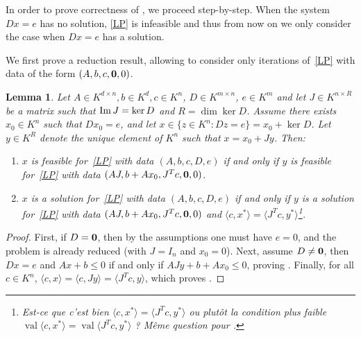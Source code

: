 \documentclass[a4paper,oneside,11pt]{article}
\newtheorem{lemma}[theorem]{Lemma}
\newcommand{\allmat}{\mathbb{M}} %
\newcommand{\simone}[1]{{\color{blue} #1}} %
\DeclareMathOperator{\val}{val}
\newcommand{\OK}{\mathcal{O}_K}
\begin{document}
In order to prove correctness of , we proceed step-by-step.
When the system $Dx=e$ has no solution, \eqref{LP} is infeasible and
thus from now on we only consider the case when $Dx=e$ has a solution.

We first prove a reduction result, allowing to consider only iterations
of~\eqref{LP} with data of the form $(A,b,c,{\bf 0},0)$.

\begin{lemma}\label{reducD}
  Let $A \in K^{d \times n}, b \in K^d, c\in K^n$, $D \in K^{m\times n}$,
  $e \in K^m$ and let $J \in K^{n \times R}$ be a matrix such that
  ${\rm Im}\, J = \ker D$ and $R = \dim \ker D$.
  Assume there exists $x_0 \in K^n$ such that $D x_0 = e$, and let
  $x \in \{z \in K^n : Dz = e\} = x_0 + \ker D$.
  Let $y \in K^R$ denote the unique element of $K^n$ such that
  $x = x_0 + J y$. Then:
  \begin{enumerate}
  \item\label{reducD_item1}
    $x$ is feasible for~\eqref{LP} with data $(A,b,c,D,e)$ if and only if 
    $y$ is feasible for~\eqref{LP} with data $(AJ,b+A x_0,J^T c,{\bf 0},0)$.
  \item\label{reducD_item2}
    $x$ is a solution for~\eqref{LP} with data $(A,b,c,D,e)$ if and only if 
    $y$ is a solution for~\eqref{LP} with data $(AJ,b+A x_0,J^T c,{\bf 0},0)$ and
    $\langle c,x^* \rangle = \langle J^T c,y^* \rangle$\footnote{\simone{Est-ce que
    c'est bien $\langle c,x^* \rangle = \langle J^T c,y^* \rangle$ ou plutôt la condition
    plus faible $\val \langle c,x^* \rangle = \val \langle J^T c,y^* \rangle$ ?
  Même question pour \Cref{solsLP}.}}.
  \end{enumerate}
\end{lemma}
\begin{proof}
  First, if $D={\bf 0}$, then by the assumptions one must have $e=0$, and the problem
  is already reduced (with $J=I_n$ and $x_0=0$).
  Next, assume $D\neq{\bf 0}$, then $Dx=e$ and $Ax + b \le 0$ if and only if
  $AJy + b+Ax_0 \le 0$, proving . Finally, for all
  $c \in K^n$, $\langle c,x\rangle = \langle c, Jy\rangle = \langle J^T c,y\rangle$, which proves .
\end{proof}
 
\end{document}
